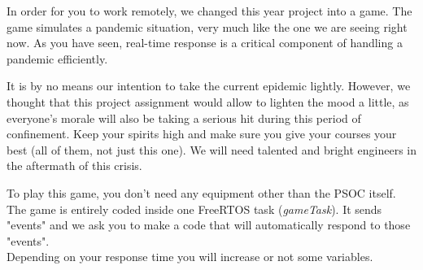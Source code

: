 In order  for you to work remotely, we changed this year project into a game. The game simulates a pandemic situation, very much like the one we are seeing right now. As you have seen, real-time response is a critical component of handling a pandemic efficiently. 

It is by no means our intention to take the current epidemic lightly. However, we thought that this project assignment would allow to lighten the mood a little, as everyone's morale will also be taking a serious hit during this period of confinement. Keep your spirits high and make sure you give your courses your best (all of them, not just this one). We will need talented and bright engineers in the aftermath of this crisis.  

To play this game, you don't need any equipment other than the PSOC itself.
The game is entirely coded inside one FreeRTOS task (\textit{gameTask}).
It sends "events" and we ask you to make a code that will automatically respond to those "events".\\
Depending on your response time you will increase or not some variables.
